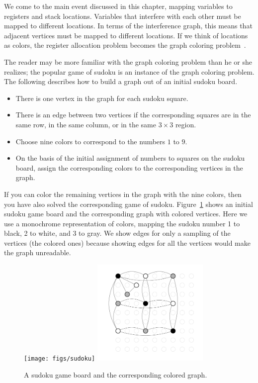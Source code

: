 \documentclass[7x10]{TimesAPriori_MIT}%
\numberwithin{theorem}{chapter}
\numberwithin{definition}{chapter}
\numberwithin{equation}{chapter}
\begin{document}
We come to the main event discussed in this chapter, mapping variables
to registers and stack locations. Variables that interfere with each
other must be mapped to different locations.  In terms of the
interference graph, this means that adjacent vertices must be mapped
to different locations.  If we think of locations as colors, the
register allocation problem becomes the graph coloring
problem~\citep{Balakrishnan:1996ve,Rosen:2002bh}.

The reader may be more familiar with the graph coloring problem than he
or she realizes; the popular game of sudoku is an instance of the
graph coloring problem. The following describes how to build a graph
out of an initial sudoku board.
\begin{itemize}
\item There is one vertex in the graph for each sudoku square.
\item There is an edge between two vertices if the corresponding squares
  are in the same row, in the same column, or in the same $3\times 3$ region.
\item Choose nine colors to correspond to the numbers $1$ to $9$.
\item On the basis of the initial assignment of numbers to squares on the
  sudoku board, assign the corresponding colors to the corresponding
  vertices in the graph.
\end{itemize}
If you can color the remaining vertices in the graph with the nine
colors, then you have also solved the corresponding game of sudoku.
Figure~\ref{fig:sudoku-graph} shows an initial sudoku game board and
the corresponding graph with colored vertices.  Here we use a
monochrome representation of colors, mapping the sudoku number 1 to
black, 2 to white, and 3 to gray.  We show edges for only a sampling
of the vertices (the colored ones) because showing edges for all the
vertices would make the graph unreadable.

\begin{figure}[tbp]
\begin{tcolorbox}[colback=white]
\texttt{[image: figs/sudoku]}
\includegraphics[width=0.5\textwidth]{figs/sudoku-graph-bw}
\end{tcolorbox}
\caption{A sudoku game board and the corresponding colored graph.}
\label{fig:sudoku-graph}
\end{figure}
\end{document}
